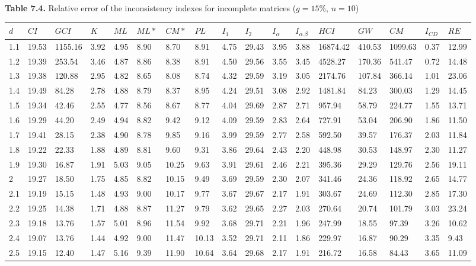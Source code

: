 \newpage
\textbf{Table 7.4.} Relative error of the inconsistency indexes for incomplete matrices ($g=15\%$, $n=10$)
\begin{adjustbox}{angle=90}
  \begin{center}
    \begin{tabular}{|l|llllllllllllllll|}
      \hline $d$ &
$CI$&$GCI$&$K$&$ML$&$ML*$&$CM*$&$PL$&$I_1$&$I_2$&$I_{\alpha}$&$I_{\alpha.\beta}$&$HCI$&$GW$&$CM$&$I_{CD}$&$RE$\\ \hline \hline
1.1&19.53&1155.16&3.92&4.95&8.90&8.70&8.91&4.75&29.43&3.95&3.88&16874.42&410.53&1099.63&0.37&12.99  \\ 
1.2&19.39&253.54&3.46&4.87&8.86&8.38&8.91&4.50&29.56&3.55&3.45&4528.27&170.36&541.47&0.72&14.48  \\ 
1.3&19.38&120.88&2.95&4.82&8.65&8.08&8.74&4.32&29.59&3.19&3.05&2174.76&107.84&366.14&1.01&23.06  \\ 
1.4&19.49&84.28&2.78&4.88&8.79&8.37&8.95&4.24&29.51&3.08&2.92&1481.84&84.23&300.03&1.29&14.45  \\ 
1.5&19.34&42.46&2.55&4.77&8.56&8.67&8.77&4.04&29.69&2.87&2.71&957.94&58.79&224.77&1.55&13.71  \\ 
1.6&19.29&44.20&2.49&4.94&8.82&9.42&9.12&4.09&29.59&2.83&2.64&727.91&53.04&206.90&1.86&11.50  \\ 
1.7&19.41&28.15&2.38&4.90&8.78&9.85&9.16&3.99&29.59&2.77&2.58&592.50&39.57&176.37&2.03&11.84  \\ 
1.8&19.22&22.33&1.88&4.89&8.81&9.60&9.31&3.86&29.64&2.43&2.20&448.98&30.53&148.97&2.30&11.27  \\ 
1.9&19.30&16.87&1.91&5.03&9.05&10.25&9.63&3.91&29.61&2.46&2.21&395.36&29.29&129.76&2.56&19.11  \\ 
2&19.27&18.50&1.75&4.85&8.82&10.15&9.49&3.69&29.59&2.30&2.07&341.46&24.36&118.92&2.65&14.77  \\ 
2.1&19.19&15.15&1.48&4.93&9.00&10.17&9.77&3.67&29.67&2.17&1.91&303.67&24.69&112.30&2.85&17.30  \\ 
2.2&19.25&14.38&1.71&4.88&8.87&11.27&9.79&3.62&29.65&2.27&2.03&270.64&20.74&101.79&3.03&23.24  \\ 
2.3&19.18&13.76&1.57&5.01&8.96&11.54&9.92&3.68&29.71&2.21&1.96&247.99&18.55&97.39&3.26&10.62  \\ 
2.4&19.07&13.76&1.44&4.92&9.00&11.47&10.13&3.52&29.71&2.11&1.86&229.97&16.87&90.29&3.35&9.43  \\ 
2.5&19.15&12.40&1.47&5.16&9.39&11.90&10.64&3.64&29.68&2.17&1.91&216.72&16.58&84.43&3.65&11.09  \\ 

\end{tabular}
\end{center}
\end{adjustbox}

